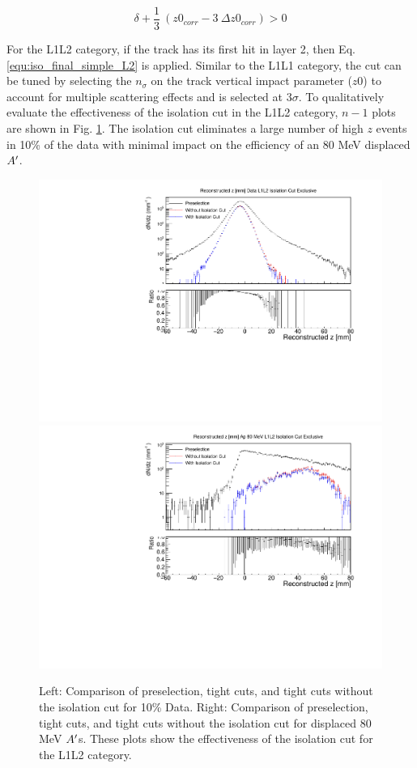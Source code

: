 \begin{equation}
    \delta + \frac{1}{3} \ (z0_{corr} - 3 \ \Delta z0_{corr})> 0
    \label{equ:iso_final_simple_L2}
\end{equation}

For the L1L2 category, if the track has its first hit in layer 2, then Eq. \ref{equ:iso_final_simple_L2} is applied. Similar to the L1L1 category, the cut can be tuned by selecting the $n_{\sigma}$ on the track vertical impact parameter ($z0$) to account for multiple scattering effects and is selected at $3\sigma$. To qualitatively evaluate the effectiveness of the isolation cut in the L1L2 category, $n-1$ plots are shown in Fig. \ref{fig:isocut_L1L2}. The isolation cut eliminates a large number of high $z$ events in 10\% of the data with minimal impact on the efficiency of an 80 MeV displaced $A^\prime$.

\begin{figure}[!ht] 
    \centering
    \includegraphics[width=.45\textwidth]{figs/selection/isocut_n_1_z_L1L2.pdf}
    \includegraphics[width=.45\textwidth]{figs/selection/ap_80MeV_isocut_n_1_z_L1L2.pdf}
    \caption{
    	Left: Comparison of preselection, tight cuts, and tight cuts without the isolation cut for 10\% Data. Right: Comparison of preselection, tight cuts, and tight cuts without the isolation cut for displaced 80 MeV $A^\prime$s. These plots show the effectiveness of the isolation cut for the L1L2 category.
    }
    \label{fig:isocut_L1L2}
\end{figure} 

